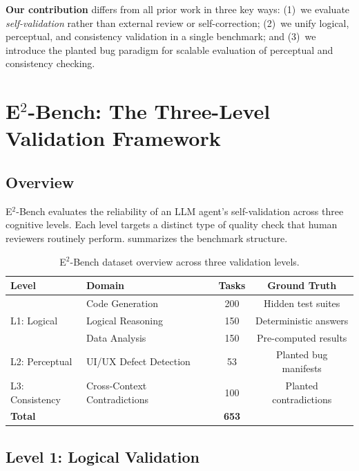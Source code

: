 \documentclass[11pt]{fairmeta}
\begin{document}
\textbf{Our contribution} differs from all prior work in three key ways: (1)~we evaluate \textit{self-validation} rather than external review or self-correction; (2)~we unify logical, perceptual, and consistency validation in a single benchmark; and (3)~we introduce the planted bug paradigm for scalable evaluation of perceptual and consistency checking.

\section{E$^2$-Bench: The Three-Level Validation Framework}

\subsection{Overview}

E$^2$-Bench evaluates the reliability of an LLM agent's self-validation across three cognitive levels. Each level targets a distinct type of quality check that human reviewers routinely perform.  summarizes the benchmark structure.

\begin{table}[h]
\centering
\caption{E$^2$-Bench dataset overview across three validation levels.}
\label{tab:benchmark_overview}
\small
\begin{tabular}{llcc}
\toprule
\textbf{Level} & \textbf{Domain} & \textbf{Tasks} & \textbf{Ground Truth} \\
\midrule
\multirow{3}{*}{L1: Logical} & Code Generation & 200 & Hidden test suites \\
 & Logical Reasoning & 150 & Deterministic answers \\
 & Data Analysis & 150 & Pre-computed results \\
\midrule
L2: Perceptual & UI/UX Defect Detection & 53 & Planted bug manifests \\
\midrule
L3: Consistency & Cross-Context Contradictions & 100 & Planted contradictions \\
\midrule
\multicolumn{2}{l}{\textbf{Total}} & \textbf{653} & \\
\bottomrule
\end{tabular}
\end{table}

\subsection{Level 1: Logical Validation}
\end{document}

